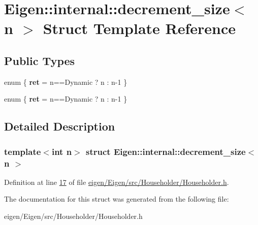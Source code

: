 \hypertarget{struct_eigen_1_1internal_1_1decrement__size}{}\section{Eigen\+:\+:internal\+:\+:decrement\+\_\+size$<$ n $>$ Struct Template Reference}
\label{struct_eigen_1_1internal_1_1decrement__size}
\subsection*{Public Types}
\begin{DoxyCompactItemize}
\item 
\mbox{\label{struct_eigen_1_1internal_1_1decrement__size_ae36fa1bc1ec92d2bcd74afe98cc52824}} 
enum \{ {\bfseries ret} = n==Dynamic ? n \+: n-\/1
 \}
\item 
\mbox{\label{struct_eigen_1_1internal_1_1decrement__size_a57a9bfa0be1060ffd1b59c0ddf889f1d}} 
enum \{ {\bfseries ret} = n==Dynamic ? n \+: n-\/1
 \}
\end{DoxyCompactItemize}


\subsection{Detailed Description}
\subsubsection*{template$<$int n$>$\newline
struct Eigen\+::internal\+::decrement\+\_\+size$<$ n $>$}



Definition at line \hyperlink{eigen_2_eigen_2src_2_householder_2_householder_8h_source_l00017}{17} of file \hyperlink{eigen_2_eigen_2src_2_householder_2_householder_8h_source}{eigen/\+Eigen/src/\+Householder/\+Householder.\+h}.



The documentation for this struct was generated from the following file\+:\begin{DoxyCompactItemize}
\item 
eigen/\+Eigen/src/\+Householder/\+Householder.\+h\end{DoxyCompactItemize}
